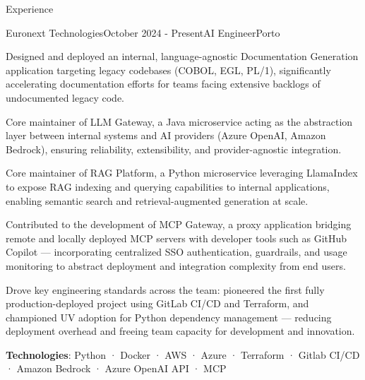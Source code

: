 \documentclass[
	11pt, %
]{cv} %
\begin{document}
\begin{rSection}{Experience}

	\begin{rSubsection}{Euronext Technologies}{October 2024 - Present}{AI Engineer}{Porto}
		\item Designed and deployed an internal, language-agnostic Documentation Generation application targeting legacy codebases (COBOL, EGL, PL/1), significantly accelerating documentation efforts for teams facing extensive backlogs of undocumented legacy code.
		\item Core maintainer of LLM Gateway, a Java microservice acting as the abstraction layer between internal systems and AI providers (Azure OpenAI, Amazon Bedrock), ensuring reliability, extensibility, and provider-agnostic integration.
		\item Core maintainer of RAG Platform, a Python microservice leveraging LlamaIndex to expose RAG indexing and querying capabilities to internal applications, enabling semantic search and retrieval-augmented generation at scale.
		\item Contributed to the development of MCP Gateway, a proxy application bridging remote and locally deployed MCP servers with developer tools such as GitHub Copilot — incorporating centralized SSO authentication, guardrails, and usage monitoring to abstract deployment and integration complexity from end users.
		\item Drove key engineering standards across the team: pioneered the first fully production-deployed project using GitLab CI/CD and Terraform, and championed UV adoption for Python dependency management — reducing deployment overhead and freeing team capacity for development and innovation.
		\item \textbf{Technologies}: Python · Docker · AWS · Azure · Terraform · Gitlab CI/CD · Amazon Bedrock · Azure OpenAI API · MCP
	\end{rSubsection}



\end{rSection}
\end{document}
